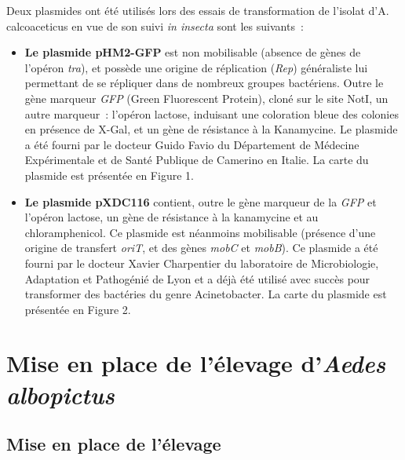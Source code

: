 Deux plasmides ont été utilisés lors des essais de transformation de l’isolat d’A. calcoaceticus en vue de son suivi \textit{in insecta} sont les suivants~:
\begin{itemize}
\item \textbf{Le plasmide pHM2-GFP} est non mobilisable (absence de gènes de l'opéron \textit{tra}), et possède une origine de réplication (\textit{Rep}) généraliste lui permettant de se répliquer dans de nombreux groupes bactériens.
Outre le gène marqueur \textit{GFP} (Green Fluorescent Protein), cloné sur le site NotI, un autre marqueur~: l'opéron lactose, induisant une coloration bleue des colonies en présence de X-Gal, et un gène de résistance à la Kanamycine.
Le plasmide a été fourni par le docteur Guido Favio du Département de Médecine Expérimentale et de Santé Publique de Camerino en Italie. La carte du plasmide est présentée en Figure 1.\cite{favia2007}

\item \textbf{Le plasmide pXDC116} contient, outre le gène marqueur de la \textit{GFP} et l'opéron lactose, un gène de résistance à la kanamycine et au chloramphenicol. Ce plasmide est néanmoins mobilisable (présence d'une origine de transfert \textit{oriT}, et des gènes \textit{mobC} et \textit{mobB}).
Ce plasmide a été fourni par le docteur Xavier Charpentier du laboratoire de Microbiologie, Adaptation et Pathogénié de Lyon et a déjà été utilisé avec succès pour transformer des bactéries du genre Acinetobacter. La carte du plasmide est présentée en Figure 2.

\end{itemize}


\section{Mise en place de l'élevage d'\textit{Aedes albopictus}}

\subsection{Mise en place de l'élevage}

